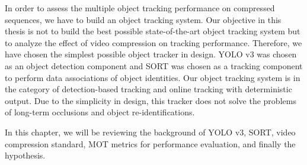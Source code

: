 
In order to assess the multiple object tracking performance on compressed sequences, we have to build an object tracking system. Our objective in this thesis is not to build the best possible state-of-the-art object tracking system but to analyze the effect of video compression on tracking performance. Therefore, we have chosen the simplest possible object tracker in design. YOLO v3 was chosen as an object detection component and SORT was chosen as a tracking component to perform data associations of object identities. Our object tracking system is in the category of detection-based tracking and online tracking with deterministic output. Due to the simplicity in design, this tracker does not solve the problems of long-term occlusions and object re-identifications.

In this chapter, we will be reviewing the background of YOLO v3, SORT, video compression standard, MOT metrics for performance evaluation, and finally the hypothesis.